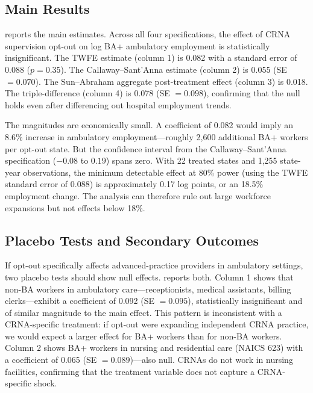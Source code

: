 \documentclass[12pt]{article}
\begin{document}
\subsection{Main Results}



 reports the main estimates. Across all four specifications, the effect of CRNA supervision opt-out on log BA+ ambulatory employment is statistically insignificant. The TWFE estimate (column 1) is 0.082 with a standard error of 0.088 ($p = 0.35$). The Callaway--Sant'Anna estimate (column 2) is 0.055 (SE $= 0.070$). The Sun--Abraham aggregate post-treatment effect (column 3) is 0.018. The triple-difference (column 4) is 0.078 (SE $= 0.098$), confirming that the null holds even after differencing out hospital employment trends.

The magnitudes are economically small. A coefficient of 0.082 would imply an 8.6\% increase in ambulatory employment---roughly 2,600 additional BA+ workers per opt-out state. But the confidence interval from the Callaway--Sant'Anna specification ($-0.08$ to $0.19$) spans zero. With 22 treated states and 1,255 state-year observations, the minimum detectable effect at 80\% power (using the TWFE standard error of 0.088) is approximately 0.17 log points, or an 18.5\% employment change. The analysis can therefore rule out large workforce expansions but not effects below 18\%.


\subsection{Placebo Tests and Secondary Outcomes}



If opt-out specifically affects advanced-practice providers in ambulatory settings, two placebo tests should show null effects.  reports both. Column 1 shows that non-BA workers in ambulatory care---receptionists, medical assistants, billing clerks---exhibit a coefficient of 0.092 (SE $= 0.095$), statistically insignificant and of similar magnitude to the main effect. This pattern is inconsistent with a CRNA-specific treatment: if opt-out were expanding independent CRNA practice, we would expect a larger effect for BA+ workers than for non-BA workers. Column 2 shows BA+ workers in nursing and residential care (NAICS 623) with a coefficient of 0.065 (SE $= 0.089$)---also null. CRNAs do not work in nursing facilities, confirming that the treatment variable does not capture a CRNA-specific shock.
\end{document}
